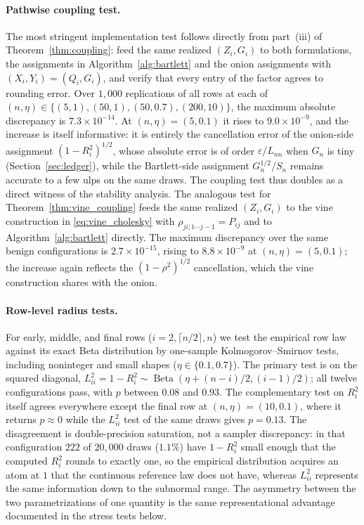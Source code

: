 \documentclass[12pt,english]{article}
\theoremstyle{plain} %
\theoremstyle{definition} %
\theoremstyle{remark} %
\newcommand{\xsec}[2]{Section~\ref{#1}}
\newcommand{\xthm}[2]{Theorem~\ref{#1}}
\newcommand{\xalg}[2]{Algorithm~\ref{#1}}
\newcommand{\xeq}[2]{\eqref{#1}}
\begin{document}
\paragraph{Pathwise coupling test.}
The most stringent implementation test follows directly from part~(iii) of \xthm{thm:coupling}{1}: feed the same realized $(Z_i,G_i)$ to both formulations, the assignments in \xalg{alg:bartlett}{1} and the onion assignments with $(X_i,Y_i)=(Q_i,G_i)$, and verify that every entry of the factor agrees to rounding error. Over $1{,}000$ replications of all rows at each of $(n,\eta)\in\{(5,1),(50,1),(50,0.7),(200,10)\}$, the maximum absolute discrepancy is $7.3\times10^{-14}$. At $(n,\eta)=(5,0.1)$ it rises to $9.0\times10^{-9}$, and the increase is itself informative: it is entirely the cancellation error of the onion-side assignment $(1-R_i^2)^{1/2}$, whose absolute error is of order $\varepsilon/L_{nn}$ when $G_n$ is tiny (\xsec{sec:ledger}{7}), while the Bartlett-side assignment $G_n^{1/2}/S_n$ remains accurate to a few ulps on the same draws. The coupling test thus doubles as a direct witness of the stability analysis. The analogous test for \xthm{thm:vine_coupling}{2} feeds the same realized $(Z_i,G_i)$ to the vine construction in \xeq{eq:vine_cholesky}{1} with $\rho_{ji;1\cdots j-1}=P_{ij}$ and to \xalg{alg:bartlett}{1} directly. The maximum discrepancy over the same benign configurations is $2.7\times10^{-15}$, rising to $8.8\times10^{-9}$ at $(n,\eta)=(5,0.1)$; the increase again reflects the $(1-\rho^2)^{1/2}$ cancellation, which the vine construction shares with the onion.

\paragraph{Row-level radius tests.}
For early, middle, and final rows ($i=2,\lceil n/2\rceil,n$) we test the empirical row law against its exact Beta distribution by one-sample Kolmogorov--Smirnov tests, including noninteger and small shapes ($\eta\in\{0.1,0.7\}$). The primary test is on the squared diagonal, $L_{ii}^2=1-R_i^2\sim\operatorname{Beta}(\eta+(n-i)/2,(i-1)/2)$; all twelve configurations pass, with $p$ between $0.08$ and $0.93$. The complementary test on $R_i^2$ itself agrees everywhere except the final row at $(n,\eta)=(10,0.1)$, where it returns $p\approx0$ while the $L_{ii}^2$ test of the same draws gives $p=0.13$. The disagreement is double-precision saturation, not a sampler discrepancy: in that configuration $222$ of $20{,}000$ draws ($1.1\%$) have $1-R_i^2$ small enough that the computed $R_i^2$ rounds to exactly one, so the empirical distribution acquires an atom at $1$ that the continuous reference law does not have, whereas $L_{ii}^2$ represents the same information down to the subnormal range. The asymmetry between the two parametrizations of one quantity is the same representational advantage documented in the stress tests below.
\end{document}
